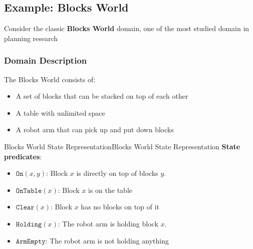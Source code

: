 \documentclass[a4paper]{article}
\theoremstyle{definition}
\begin{document}
\subsection{Example: Blocks World}
Consider the classic \textbf{Blocks World} domain, one of the most studied domain in planning research
\subsubsection{Domain Description}
The Blocks World consists of:
\begin{itemize}
    \item A set of blocks that can be stacked on top of each other 
    \item A table with unlimited space
    \item A robot arm that can pick up and put down blocks
\end{itemize}
\begin{example}{Blocks World State Representation}{Blocks World State Representation}
\textbf{State predicates}:
\begin{itemize}
    \item \( \texttt{On}(x,y) \): Block \( x \) is directly on top of blocks \( y \).
    \item \( \texttt{OnTable}(x) \): Block \( x \) is on the table 
    \item \( \texttt{Clear}(x) \): Block \( x \) has no blocks on top of it 
    \item \( \texttt{Holding}(x) \): The robot arm is holding block \( x \).
    \item \( \texttt{ArmEmpty} \): The robot arm is not holding anything
\end{itemize}
\end{example}
\end{document}
